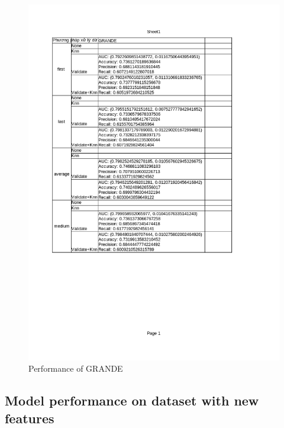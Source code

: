 \documentclass[../main.tex]{subfiles}
\begin{document}
 \begin{figure}[H]
    \centering
    \includegraphics[width=\textwidth]{Figure/KidneyResultLimit_GRANDE.png}
    \caption{Performance of GRANDE}
    \label{fig:KidneyResultLimit_GRANDE}
\end{figure}


\subsection{Model performance on dataset with new features}
\end{document}
